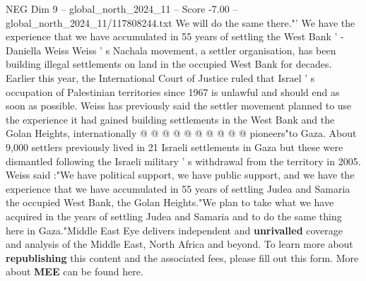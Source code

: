 \begin{textsample}{NEG Dim 9 – global\_north\_2024\_11 – Score -7.00 – global\_north\_2024\_11/117808244.txt}
We will do the same there."' We have the experience that we have accumulated in 55 years of settling the West Bank ' - Daniella Weiss Weiss ' s Nachala movement, a settler organisation, has been building illegal settlements on land in the occupied West Bank for decades.
Earlier this year, the International Court of Justice ruled that Israel ' s occupation of Palestinian territories since 1967 is unlawful and should end as soon as possible.
Weiss has previously said the settler movement planned to use the experience it had gained building settlements in the West Bank and the Golan Heights, internationally @ @ @ @ @ @ @ @ @ @ pioneers"to Gaza.
About 9,000 settlers previously lived in 21 Israeli settlements in Gaza but these were dismantled following the Israeli military ' s withdrawal from the territory in 2005.
Weiss said :"We have political support, we have public support, and we have the experience that we have accumulated in 55 years of settling Judea and Samaria the occupied West Bank, the Golan Heights."We plan to take what we have acquired in the years of settling Judea and Samaria and to do the same thing here in Gaza."Middle East Eye delivers independent and \textbf{unrivalled} coverage and analysis of the Middle East, North Africa and beyond.
To learn more about \textbf{republishing} this content and the associated fees, please fill out this form.
More about \textbf{MEE} can be found here.

\end{textsample}
